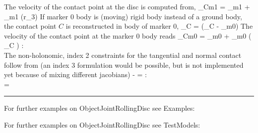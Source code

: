    \ee
    The velocity of the contact point at the disc is computed from,
    \be
      _{Cm1} = _{m1} + _{m1} \times (r\cdot {}_3)
    \ee
    If marker 0 body is (moving) rigid body instead of a ground body, the contact point $C$ is reconstructed in 
    body of marker 0,
    \be
      _{C} =  (_{C} - _{m0})
    \ee
    The velocity of the contact point at the marker 0 body reads
    \be
      _{Cm0} = _{m0} + _{m0} \times \left(  _{C} \right)
    \ee
%
    :\\
    The non-holonomic, index 2 constraints for the tangential and normal contact follow from (an index 3 formulation would be possible, but is not implemented yet because of mixing different jacobians)
    \be
       - = \Null
    \ee
    :\\
    \be
      \zv = \Null
    \ee
\vspace{6pt}\par\noindent\rule{\textwidth}{0.4pt}
%
\noindent For further examples on ObjectJointRollingDisc see Examples:
\bi
\item{}\ei

%
%
\noindent For further examples on ObjectJointRollingDisc see TestModels:
\bi
\item{}\ei

%
\newpage

